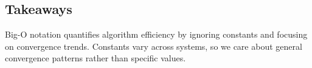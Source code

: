 \subsection{Takeaways}

Big-O notation quantifies algorithm efficiency by ignoring constants and focusing 
on convergence trends. Constants vary across systems, so we care about general 
convergence patterns rather than specific values.
